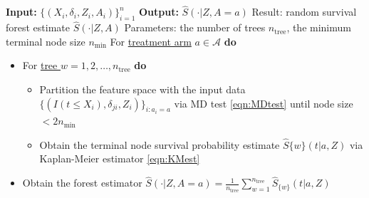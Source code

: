 \begin{algorithm}[H]
  \caption{The random survival forest estimator}
  \label{alg:RSF}
  \begin{flushleft}
    \begin{algorithmic}
  \State \textbf{Input:} $\{(X_i, \delta_i, Z_i, A_i)\}_{i=1}^n$
  \State \textbf{Output:} $\widehat{S}(\cdot|Z,A=a)$
  \State Result: random survival forest estimate $\widehat{S}(\cdot|Z,A)$
  \State Parameters: the number of trees $n_{\text{tree}}$, the minimum terminal node size $n_{\text{min}}$
  \State For \underline{treatment arm} $a \in \mathcal{A}$ \textbf{do} 
  \begin{itemize}[label={}]
  \item For \underline{tree $w = 1, 2, \ldots, n_{\text{tree}}$} \textbf{do}
  \begin{itemize}[label={}]
  \item Partition the feature space with the input data $\{(I(t\leq X_i), \delta_{ji}, Z_i)\}_{i:a_i=a}$ via MD test \cref{eqn:MDtest} until node size $< 2n_{\text{min}}$
  \item Obtain the terminal node survival probability estimate $\widehat{S}{\{w\}}(t | a, Z)$ via Kaplan-Meier estimator \cref{eqn:KMest}
  \end{itemize}
  
  \item Obtain the forest estimator $\widehat{S}(\cdot | Z, A = a) = \frac{1}{n_{\text{tree}}} \sum_{w=1}^{n_\text{tree}} \widehat{S}_{\{w\}}(t |a, Z)$
  \end{itemize}
\end{algorithmic}
\end{flushleft}
\end{algorithm}
